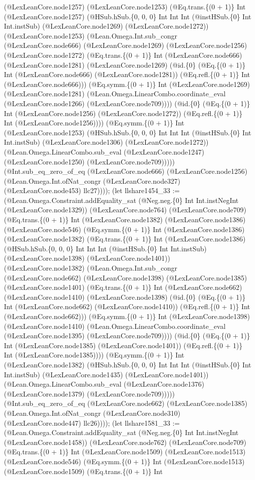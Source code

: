 \documentclass[11pt]{article}
\begin{document}
(@LexLeanCore.node1257) (@LexLeanCore.node1253) (@Eq.trans.\{(0 + 1)\} Int (@LexLeanCore.node1257) (@HSub.hSub.\{0, 0, 0\} Int Int Int (@instHSub.\{0\} Int Int.instSub) (@LexLeanCore.node1269) (@LexLeanCore.node1272)) (@LexLeanCore.node1253) (@Lean.Omega.Int.sub\_congr (@LexLeanCore.node666) (@LexLeanCore.node1269) (@LexLeanCore.node1256) (@LexLeanCore.node1272) (@Eq.trans.\{(0 + 1)\} Int (@LexLeanCore.node666) (@LexLeanCore.node1281) (@LexLeanCore.node1269) (@id.\{0\} (@Eq.\{(0 + 1)\} Int (@LexLeanCore.node666) (@LexLeanCore.node1281)) (@Eq.refl.\{(0 + 1)\} Int (@LexLeanCore.node666))) (@Eq.symm.\{(0 + 1)\} Int (@LexLeanCore.node1269) (@LexLeanCore.node1281) (@Lean.Omega.LinearCombo.coordinate\_eval (@LexLeanCore.node1266) (@LexLeanCore.node709)))) (@id.\{0\} (@Eq.\{(0 + 1)\} Int (@LexLeanCore.node1256) (@LexLeanCore.node1272)) (@Eq.refl.\{(0 + 1)\} Int (@LexLeanCore.node1256)))) (@Eq.symm.\{(0 + 1)\} Int (@LexLeanCore.node1253) (@HSub.hSub.\{0, 0, 0\} Int Int Int (@instHSub.\{0\} Int Int.instSub) (@LexLeanCore.node1306) (@LexLeanCore.node1272)) (@Lean.Omega.LinearCombo.sub\_eval (@LexLeanCore.node1247) (@LexLeanCore.node1250) (@LexLeanCore.node709))))) (@Int.sub\_eq\_zero\_of\_eq (@LexLeanCore.node666) (@LexLeanCore.node1256) (@Lean.Omega.Int.ofNat\_congr (@LexLeanCore.node327) (@LexLeanCore.node453) llc27)))); (let llshare1454\_33 := (@Lean.Omega.Constraint.addEquality\_sat (@Neg.neg.\{0\} Int Int.instNegInt (@LexLeanCore.node1329)) (@LexLeanCore.node764) (@LexLeanCore.node709) (@Eq.trans.\{(0 + 1)\} Int (@LexLeanCore.node1382) (@LexLeanCore.node1386) (@LexLeanCore.node546) (@Eq.symm.\{(0 + 1)\} Int (@LexLeanCore.node1386) (@LexLeanCore.node1382) (@Eq.trans.\{(0 + 1)\} Int (@LexLeanCore.node1386) (@HSub.hSub.\{0, 0, 0\} Int Int Int (@instHSub.\{0\} Int Int.instSub) (@LexLeanCore.node1398) (@LexLeanCore.node1401)) (@LexLeanCore.node1382) (@Lean.Omega.Int.sub\_congr (@LexLeanCore.node662) (@LexLeanCore.node1398) (@LexLeanCore.node1385) (@LexLeanCore.node1401) (@Eq.trans.\{(0 + 1)\} Int (@LexLeanCore.node662) (@LexLeanCore.node1410) (@LexLeanCore.node1398) (@id.\{0\} (@Eq.\{(0 + 1)\} Int (@LexLeanCore.node662) (@LexLeanCore.node1410)) (@Eq.refl.\{(0 + 1)\} Int (@LexLeanCore.node662))) (@Eq.symm.\{(0 + 1)\} Int (@LexLeanCore.node1398) (@LexLeanCore.node1410) (@Lean.Omega.LinearCombo.coordinate\_eval (@LexLeanCore.node1395) (@LexLeanCore.node709)))) (@id.\{0\} (@Eq.\{(0 + 1)\} Int (@LexLeanCore.node1385) (@LexLeanCore.node1401)) (@Eq.refl.\{(0 + 1)\} Int (@LexLeanCore.node1385)))) (@Eq.symm.\{(0 + 1)\} Int (@LexLeanCore.node1382) (@HSub.hSub.\{0, 0, 0\} Int Int Int (@instHSub.\{0\} Int Int.instSub) (@LexLeanCore.node1435) (@LexLeanCore.node1401)) (@Lean.Omega.LinearCombo.sub\_eval (@LexLeanCore.node1376) (@LexLeanCore.node1379) (@LexLeanCore.node709))))) (@Int.sub\_eq\_zero\_of\_eq (@LexLeanCore.node662) (@LexLeanCore.node1385) (@Lean.Omega.Int.ofNat\_congr (@LexLeanCore.node310) (@LexLeanCore.node447) llc26)))); (let llshare1581\_33 := (@Lean.Omega.Constraint.addEquality\_sat (@Neg.neg.\{0\} Int Int.instNegInt (@LexLeanCore.node1458)) (@LexLeanCore.node762) (@LexLeanCore.node709) (@Eq.trans.\{(0 + 1)\} Int (@LexLeanCore.node1509) (@LexLeanCore.node1513) (@LexLeanCore.node546) (@Eq.symm.\{(0 + 1)\} Int (@LexLeanCore.node1513) (@LexLeanCore.node1509) (@Eq.trans.\{(0 + 1)\} Int 
\end{document}
